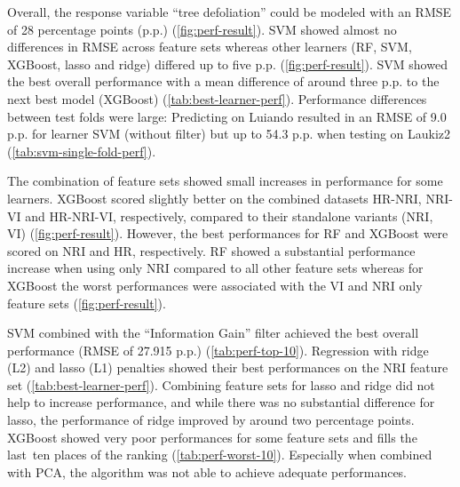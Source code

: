 \documentclass[remotesensing,article,submit,moreauthors,pdftex]{Definitions/mdpi}
\begin{document}
Overall, the response variable \enquote{tree defoliation} could be modeled with an \ac{RMSE} of 28 percentage points (p.p.) (\autoref{fig:perf-result}).
SVM showed almost no differences in RMSE across feature sets whereas other learners (RF, SVM, XGBoost, lasso and ridge) differed up to five p.p. (\autoref{fig:perf-result}).
SVM showed the best overall performance with a mean difference of around three p.p. to the next best model (XGBoost) (\autoref{tab:best-learner-perf}).
Performance differences between test folds were large: Predicting on Luiando resulted in an RMSE of 9.0 p.p. for learner SVM (without filter) but up to 54.3 p.p. when testing on Laukiz2 (\autoref{tab:svm-single-fold-perf}).

The combination of feature sets showed small increases in performance for some learners.
XGBoost scored slightly better on the combined datasets HR-NRI, NRI-VI and HR-NRI-VI, respectively, compared to their standalone variants (NRI, VI) (\autoref{fig:perf-result}).
However, the best performances for RF and XGBoost were scored on NRI and HR, respectively.
RF showed a substantial performance increase when using only NRI compared to all other feature sets whereas for XGBoost the worst performances were associated with the VI and NRI only feature sets (\autoref{fig:perf-result}).

SVM combined with the \enquote{Information Gain} filter achieved the best overall performance (RMSE of 27.915 p.p.) (\autoref{tab:perf-top-10}).
Regression with ridge (L2) and lasso (L1) penalties showed their best performances on the NRI feature set (\autoref{tab:best-learner-perf}).
Combining feature sets for lasso and ridge did not help to increase performance, and while there was no substantial difference for lasso, the performance of ridge improved by around two percentage points.
XGBoost showed very poor performances for some feature sets and fills the last\ ten places of the ranking (\autoref{tab:perf-worst-10}).
Especially when combined with PCA, the algorithm was not able to achieve adequate performances.
\end{document}

